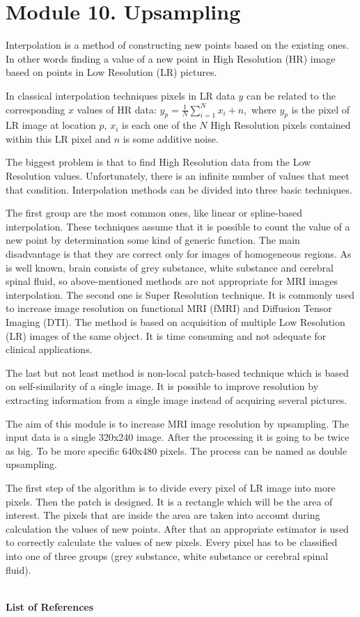 \section{Module 10. Upsampling}

Interpolation is a method of constructing new points based on the
existing ones. In other words finding a value of a new point in High
Resolution (HR) image based on points in Low Resolution (LR) pictures.

In classical interpolation techniques pixels in LR data $y$ can be
related to the corresponding $x$ values of HR data: $y_{p}=\frac{1}{N}\sum_{i=1}^{N}x_{i}+n,$
where $y_{p}$ is the pixel of LR image at location $p$, $x_{i}$
is each one of the $N$ High Resolution pixels contained within this
LR pixel and $n$ is some additive noise.

The biggest problem is that to find High Resolution data from the
Low Resolution values. Unfortunately, there is an infinite number
of values that meet that condition. Interpolation methods can be divided
into three basic techniques.

The first group are the most common ones, like linear or spline-based
interpolation. These techniques assume that it is possible to count
the value of a new point by determination some kind of generic function.
The main disadvantage is that they are correct only for images of
homogeneous regions. As is well known, brain consists of grey substance,
white substance and cerebral spinal fluid, so above-mentioned methods
are not appropriate for MRI images interpolation. The second one is
Super Resolution technique. It is commonly used to increase image
resolution on functional MRI (fMRI) and Diffusion Tensor Imaging (DTI).
The method is based on acquisition of multiple Low Resolution (LR)
images of the same object. It is time consuming and not adequate for
clinical applications.

The last but not least method is non-local patch-based technique which
is based on self-similarity of a single image. It is possible to improve
resolution by extracting information from a single image instead of
acquiring several pictures.

The aim of this module is to increase MRI image resolution by upsampling.
The input data is a single 320x240 image. After the processing it
is going to be twice as big. To be more specific 640x480 pixels. The
process can be named as double upsampling.

The first step of the algorithm is to divide every pixel of LR image
into more pixels. Then the patch is designed. It is a rectangle which
will be the area of interest. The pixels that are inside the area
are taken into account during calculation the values of new points.
After that an appropriate estimator is used to correctly calculate
the values of new pixels. Every pixel has to be classified into one
of three groups (grey substance, white substance or cerebral spinal
fluid).

\hfill{}\\
\textbf{List of References}\\
\cite{9art1}
